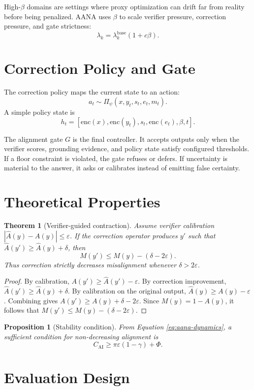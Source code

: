 \documentclass[11pt]{article}
\newtheorem{theorem}{Theorem}[section]
\newtheorem{proposition}{Proposition}[section]
\newcommand{\Ahat}{\widehat{A}}
\newcommand{\eps}{\varepsilon}
\newcommand{\Cai}{C_{\mathrm{AI}}}
\begin{document}
High-\(\beta\) domains are settings where proxy optimization can drift far from reality before being penalized. AANA uses \(\beta\) to scale verifier pressure, correction pressure, and gate strictness:
\[
\lambda_k=\lambda^{\mathrm{base}}_k(1+c\beta).
\]

\section{Correction Policy and Gate}

The correction policy maps the current state to an action:
\[
a_t\sim \Pi_\psi(x,y_t,s_t,e_t,m_t).
\]
A simple policy state is
\[
h_t=[\mathrm{enc}(x),\mathrm{enc}(y_t),s_t,\mathrm{enc}(e_t),\beta,t].
\]

The alignment gate \(G\) is the final controller. It accepts outputs only when the verifier scores, grounding evidence, and policy state satisfy configured thresholds. If a floor constraint is violated, the gate refuses or defers. If uncertainty is material to the answer, it asks or calibrates instead of emitting false certainty.

\section{Theoretical Properties}

\begin{theorem}[Verifier-guided contraction]
Assume verifier calibration \(|\Ahat(y)-A(y)|\le\eps\). If the correction operator produces \(y'\) such that \(\Ahat(y')\ge \Ahat(y)+\delta\), then
\[
M(y')\le M(y)-(\delta-2\eps).
\]
Thus correction strictly decreases misalignment whenever \(\delta>2\eps\).
\end{theorem}

\begin{proof}
By calibration, \(A(y')\ge \Ahat(y')-\eps\). By correction improvement, \(\Ahat(y')\ge \Ahat(y)+\delta\). By calibration on the original output, \(\Ahat(y)\ge A(y)-\eps\). Combining gives \(A(y')\ge A(y)+\delta-2\eps\). Since \(M(y)=1-A(y)\), it follows that \(M(y')\le M(y)-(\delta-2\eps)\).
\end{proof}

\begin{proposition}[Stability condition]
From Equation \eqref{eq:aana-dynamics}, a sufficient condition for non-decreasing alignment is
\[
\Cai \ge \pi\eps(1-\gamma)+\Phi.
\]
\end{proposition}

\section{Evaluation Design}
\end{document}
